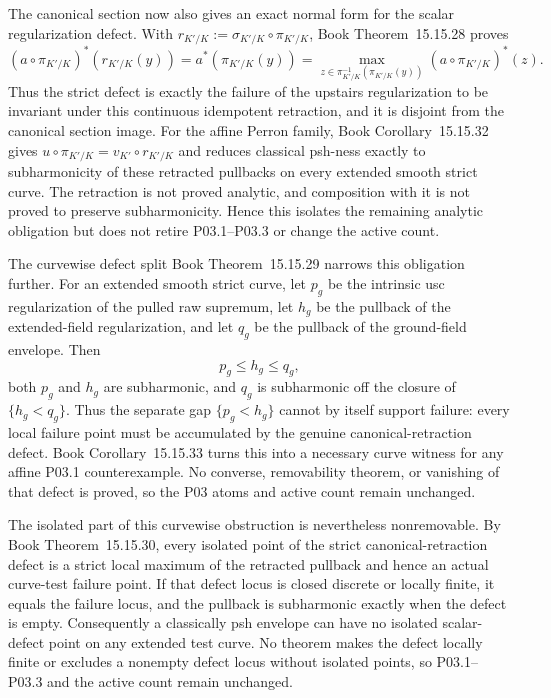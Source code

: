 \documentclass[11pt,a4paper]{article}
\theoremstyle{definition}
\theoremstyle{remark}
\begin{document}
The canonical section now also gives an exact normal form for the scalar
regularization defect.  With
\(r_{K'/K}:=\sigma_{K'/K}\circ\pi_{K'/K}\),
Book Theorem~15.15.28 proves
\[
 (a\circ\pi_{K'/K})^*(r_{K'/K}(y))
   =a^*(\pi_{K'/K}(y))
   =\max_{z\in\pi_{K'/K}^{-1}(\pi_{K'/K}(y))}
                    (a\circ\pi_{K'/K})^*(z).
\]
Thus the strict defect is exactly the failure of the upstairs regularization
to be invariant under this continuous idempotent retraction, and it is
disjoint from the canonical section image.  For the affine Perron family,
Book Corollary~15.15.32 gives
\(u\circ\pi_{K'/K}=v_{K'}\circ r_{K'/K}\) and reduces classical psh-ness
exactly to subharmonicity of these retracted pullbacks on every extended
smooth strict curve.  The retraction is not proved analytic, and composition
with it is not proved to preserve subharmonicity.  Hence this isolates the
remaining analytic obligation but does not retire P03.1--P03.3 or change the
active count.

The curvewise defect split
Book Theorem~15.15.29 narrows this obligation
further.  For an extended smooth strict curve, let \(p_g\) be the intrinsic
usc regularization of the pulled raw supremum, let \(h_g\) be the pullback of
the extended-field regularization, and let \(q_g\) be the pullback of the
ground-field envelope.  Then
\[
                         p_g\leq h_g\leq q_g,
\]
both \(p_g\) and \(h_g\) are subharmonic, and \(q_g\) is subharmonic off the
closure of \(\{h_g<q_g\}\).  Thus the separate gap \(\{p_g<h_g\}\) cannot by
itself support failure: every local failure point must be accumulated by
the genuine canonical-retraction defect.  Book Corollary~15.15.33 turns this into a necessary
curve witness for any affine P03.1 counterexample.  No converse,
removability theorem, or vanishing of that defect is proved, so the P03
atoms and active count remain unchanged.

The isolated part of this curvewise obstruction is nevertheless
nonremovable.  By
Book Theorem~15.15.30, every isolated point
of the strict canonical-retraction defect is a strict local maximum of the
retracted pullback and hence an actual curve-test failure point.  If that
defect locus is closed discrete or locally finite, it equals the failure
locus, and the pullback is subharmonic exactly when the defect is empty.
Consequently a classically psh envelope can have no isolated scalar-defect
point on any extended test curve.  No theorem makes the defect locally
finite or excludes a nonempty defect locus without isolated points, so
P03.1--P03.3 and the active count remain unchanged.
\end{document}
